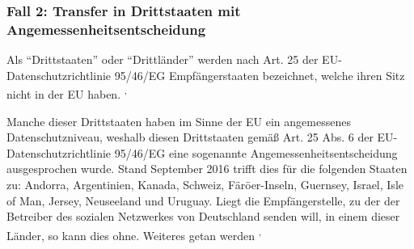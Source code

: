 \subsubsection{Fall 2: Transfer in Drittstaaten mit Angemessenheitsentscheidung}
Als "`Drittstaaten"' oder "`Drittländer"' werden nach Art. 25 der EU-Datenschutzrichtlinie 95/46/EG Empfängerstaaten bezeichnet, welche ihren Sitz nicht in der EU haben. \autocite[vgl.][]{LDI.2017}\textsuperscript{,}\autocite[vgl.][]{EG.1995}
\par
Manche dieser Drittstaaten haben im Sinne der \ac{EU} ein angemessenes Datenschutzniveau, weshalb diesen Drittstaaten gemäß Art. 25 Abs. 6 der EU-Datenschutzrichtlinie 95/46/EG eine sogenannte Angemessenheitsentscheidung ausgesprochen wurde. Stand September 2016 trifft dies für die folgenden Staaten zu: Andorra, Argentinien, Kanada, Schweiz, Färöer-Inseln, Guernsey, Israel, Isle of Man, Jersey, Neuseeland und Uruguay. Liegt die Empfängerstelle, zu der der Betreiber des sozialen Netzwerkes von Deutschland senden will, in einem dieser Länder, so kann dies ohne. Weiteres getan werden \autocite[vgl.][]{LDI.2017}\textsuperscript{,}\autocite[vgl.][]{EG.1995}

